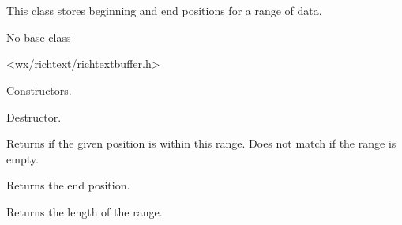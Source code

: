 \section{}\label{wxrichtextrange}

This class stores beginning and end positions for a range of data.


No base class


<wx/richtext/richtextbuffer.h>





\label{wxrichtextrangewxrichtextrange}




Constructors.

\label{wxrichtextrangedtor}


Destructor.

\label{wxrichtextrangecontains}


Returns \true if the given position is within this range. Does not
match if the range is empty.

\label{wxrichtextrangegetend}


Returns the end position.

\label{wxrichtextrangegetlength}


Returns the length of the range.

\label{wxrichtextrangegetstart}

